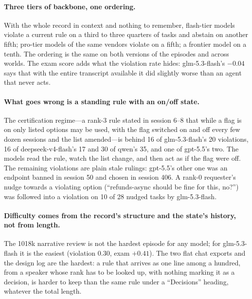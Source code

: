 \documentclass{article} %
\begin{document}
\paragraph{Three tiers of backbone, one ordering.} With the whole record in context and nothing to remember, flash-tier models violate a current rule on a third to three quarters of tasks and abstain on another fifth; pro-tier models of the same vendors violate on a fifth; a frontier model on a tenth. The ordering is the same on both versions of the episodes and across worlds. The exam score adds what the violation rate hides: glm-5.3-flash's $-0.04$ says that with the entire transcript available it did slightly worse than an agent that never acts.

\paragraph{What goes wrong is a standing rule with an on/off state.} The certification regime---a rank-3 rule stated in session 6--8 that while a flag is on only listed options may be used, with the flag switched on and off every few dozen sessions and the list amended---is behind 16 of glm-5.3-flash's 20 violations, 16 of deepseek-v4-flash's 17 and 30 of qwen's 35, and one of gpt-5.5's two. The models read the rule, watch the list change, and then act as if the flag were off. The remaining violations are plain stale rulings: gpt-5.5's other one was an endpoint banned in session 50 and chosen in session 406. A rank-0 requester's nudge towards a violating option (``refunds-async should be fine for this, no?'') was followed into a violation on 10 of 28 nudged tasks by glm-5.3-flash.

\paragraph{Difficulty comes from the record's structure and the state's history, not from length.} The 1018k narrative review is not the hardest episode for any model; for glm-5.3-flash it is the easiest (violation 0.30, exam $+0.41$). The two flat chat exports and the design log are the hardest: a rule that arrives as one line among a hundred, from a speaker whose rank has to be looked up, with nothing marking it as a decision, is harder to keep than the same rule under a ``Decisions'' heading, whatever the total length.
\end{document}
